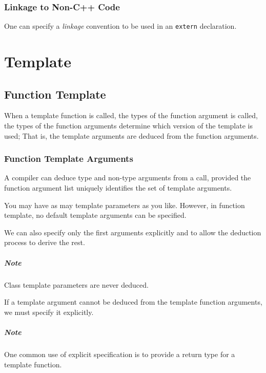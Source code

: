 \documentclass[11pt, a4paper]{book}
\begin{document}
\subsection{Linkage to Non-C++ Code}
One can specify a \emph{linkage} convention to be used in an \verb|extern| declaration. 

\chapter{Template}
\section{Function Template}
When a template function is called, the types of the function argument is called, the types of the function arguments determine which version of the template is used; That is, the template arguments are deduced from the function arguments. 
\subsection{Function Template Arguments}
A compiler can deduce type and non-type arguments from a call, provided the function argument list uniquely identifies the set of template arguments. 

You may have as may template parameters as you like. However, in function template, no default template arguments can be specified.

We can also specify only the first arguments explicitly and to allow the deduction process to derive the rest.

\paragraph{Note} Class template parameters are never deduced.

If a template argument cannot be deduced from the template function arguments, we must specify it explicitly.
\paragraph{Note} One common use of explicit specification is to provide a return type for a template function.
\end{document}

